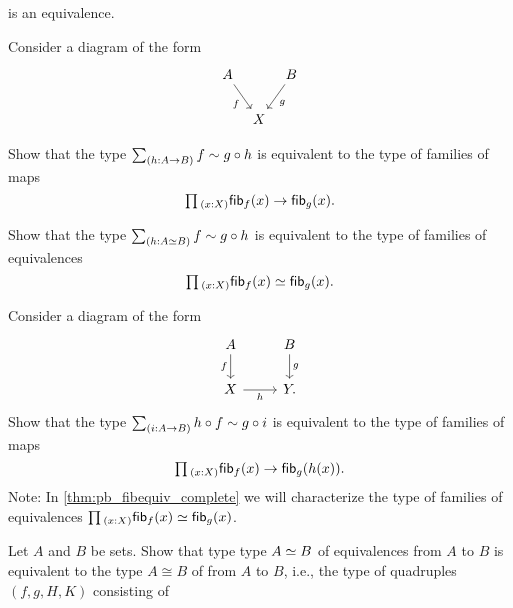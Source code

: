 \begin{exercises}
is an equivalence.
\item \label{ex:triangle_fib}Consider a diagram of the form
\begin{equation*}
\begin{tikzcd}[column sep=tiny]
A \arrow[dr,swap,"f"] & & B \arrow[dl,"g"] \\
& X
\end{tikzcd}
\end{equation*}
\begin{subexenum}
\item Show that the type $\sm{h:A\to B} f\htpy g\circ h$ is equivalent to the type of families of maps
\begin{equation*}
\prd{x:X}\fib{f}{x}\to\fib{g}{x}.
\end{equation*}
\item Show that the type $\sm{h:\eqv{A}{B}} f\htpy g\circ h$ is equivalent to the type of families of equivalences
\begin{equation*}
\prd{x:X}\fib{f}{x}\eqvsym\fib{g}{x}.
\end{equation*}
\end{subexenum}
\item \label{ex:sq_fib}Consider a diagram of the form
\begin{equation*}
\begin{tikzcd}
A \arrow[d,swap,"f"] & B \arrow[d,"g"] \\
X \arrow[r,swap,"h"] & Y.
\end{tikzcd}
\end{equation*}
Show that the type $\sm{i:A\to B}h\circ f\htpy g\circ i$ is equivalent to the type of families of maps
\begin{equation*}
\prd{x:X}\fib{f}{x}\to\fib{g}{h(x)}.
\end{equation*}
Note: In \cref{thm:pb_fibequiv_complete} we will characterize the type of families of equivalences $\prd{x:X}\fib{f}{x}\simeq\fib{g}{x}$.
\item \label{ex:iso_equiv}Let $A$ and $B$ be sets. Show that type type $\eqv{A}{B}$ of equivalences from $A$ to $B$ is equivalent to the type $A\cong B$ of  from $A$ to $B$, i.e., the type of quadruples $(f,g,H,K)$ consisting of

\end{exercises}
